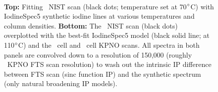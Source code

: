 \begin{figure}
\centering
{}\
\caption{{\bf Top:} Fitting \het\ NIST scan (black dots; temperature
set at 70$^{\circ}$C) with IodineSpec5 synthetic iodine lines at
various temperatures and column densities. {\bf Bottom:} The \het\
NIST scan (black dots) overplotted with the best-fit IodineSpec5 model
(black solid line; at 110$^{\circ}$C) and the \het\ cell and \keck\ 
cell KPNO scans. All spectra in both panels are convolved down to a
resolution of 150,000 (roughly \keck\ KPNO FTS scan resolution) to
wash out the intrinsic IP difference between FTS scan (sinc function
IP) and the synthetic spectrum (only natural broadening IP models).
\label{het:fig:nistfit}}
\end{figure}


